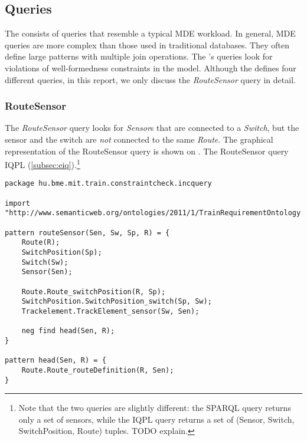 \subsection{Queries}

The \tb{} consists of queries that resemble a typical MDE workload. In general, MDE queries are more complex than those used in traditional databases. They often define large patterns with multiple join operations. The \tb{}'s queries look for violations of well-formedness constraints in the model. Although the \tb{} defines four different queries, in this report, we only discuss the \textit{RouteSensor} query in detail.

\subsubsection{RouteSensor}


The \textit{RouteSensor} query looks for \textit{Sensor}s that are connected to a \textit{Switch}, but the sensor and the switch are \emph{not} connected to the same \textit{Route}. The graphical representation of the RouteSensor query is shown on . The RouteSensor query  IQPL (\autoref{subsec:eiq}).\footnote{Note that the two queries are slightly different: the SPARQL query returns only a set of sensors, while the IQPL query returns a set of (Sensor, Switch, SwitchPosition, Route) tuples. TODO explain.}

\begin{lstlisting}[caption=The \emph{RouteSensor} query in IQPL, label=lst:routesensor-iqpl]
package hu.bme.mit.train.constraintcheck.incquery

import "http://www.semanticweb.org/ontologies/2011/1/TrainRequirementOntology.owl" 

pattern routeSensor(Sen, Sw, Sp, R) = {
	Route(R);
	SwitchPosition(Sp);
	Switch(Sw);
	Sensor(Sen);
	
	Route.Route_switchPosition(R, Sp);
	SwitchPosition.SwitchPosition_switch(Sp, Sw);
	Trackelement.TrackElement_sensor(Sw, Sen);
	
	neg find head(Sen, R);	
}

pattern head(Sen, R) = {
	Route.Route_routeDefinition(R, Sen);
}
\end{lstlisting}



